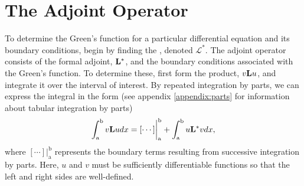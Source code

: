 \section{The Adjoint Operator}
To determine the Green's function for a particular differential equation and its boundary conditions, begin by finding the , denoted \(\mathcal{L}^*\). The adjoint operator consists of the formal adjoint, \(\mathrm{\bf{L^*}}  \), and the boundary conditions associated with the Green's function. To determine these, first form the product, \(v\mathrm{\bf{L}} u\), and integrate it over the interval of interest. By repeated integration by parts, we can express the integral in the form (see appendix \ref{appendix:parts} for information about tabular integration by parts)
\begin{equation} \label{eq:adjoint}
	\int_\mathrm{a}^\mathrm{b} v \mathrm{\bf{L}} u dx = [\cdots]\biggr\rvert_\mathrm{a}^\mathrm{b} + \int_\mathrm{a}^\mathrm{b} u\mathrm{\bf{L^*}}  v dx,
\end{equation}
where \([\cdots]\biggr\rvert_\mathrm{a}^\mathrm{b}\) represents the boundary terms resulting from successive integration by parts. Here, \(u\) and \(v\) must be sufficiently differentiable functions so that the left and right sides are well-defined. 


